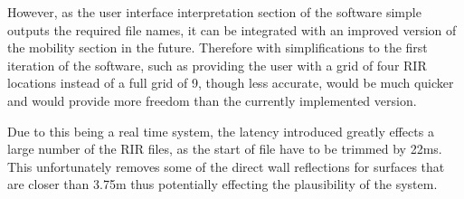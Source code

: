 \documentclass[../../main.tex]{subfiles}
\begin{document}
 		However, as the user interface interpretation section of the software simple outputs the required file names, it can be integrated with an improved version of the mobility section in the future. Therefore with simplifications to the first iteration of the software, such as providing the user with a grid of four \ac{RIR} locations instead of a full grid of 9, though less accurate, would be much quicker and would provide more freedom than the currently implemented version.

		Due to this being a real time system, the latency introduced greatly effects a large number of the \ac{RIR} files, as the start of file have to be trimmed by 22ms. This unfortunately removes some of the direct wall reflections for surfaces that are closer than 3.75m thus potentially effecting the plausibility of the system.




		
\end{document}
